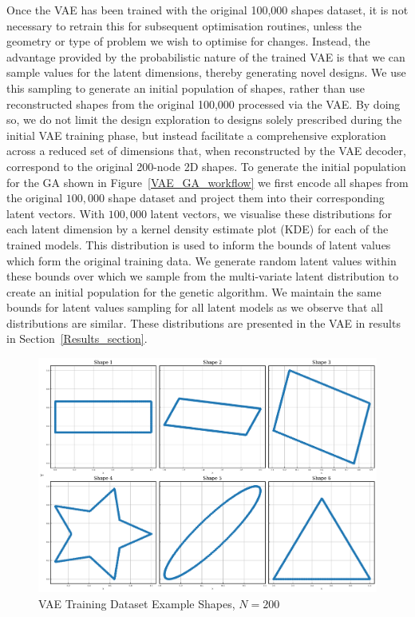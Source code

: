 \documentclass{article}
\begin{document}
Once the VAE has been trained with the original 100,000 shapes dataset, it is not necessary to retrain this for subsequent optimisation routines, unless the geometry or type of problem we wish to optimise for changes. Instead, the advantage provided by the probabilistic nature of the trained VAE is that we can sample values for the latent dimensions, thereby generating novel designs. We use this sampling to generate an initial population of shapes, rather than use reconstructed shapes from the original 100,000 processed via the VAE. By doing so, we do not limit the design exploration to designs solely prescribed during the initial VAE training phase, but instead facilitate a comprehensive exploration across a reduced set of dimensions that, when reconstructed by the VAE decoder, correspond to the original 200-node 2D shapes. To generate the initial population for the GA shown in Figure~\ref{VAE_GA_workflow} we first encode all shapes from the original $100,000$ shape dataset and project them into their corresponding latent vectors. With $100,000$ latent vectors, we visualise these distributions for each latent dimension by a kernel density estimate plot (KDE) for each of the trained models. This distribution is used to inform the bounds of latent values which form the original training data. We generate random latent values within these bounds over which we sample from the multi-variate latent distribution to create an initial population for the genetic algorithm. We maintain the same bounds for latent values sampling for all latent models as we observe that all distributions are similar. These distributions are presented in the VAE in results in Section~\ref{Results_section}.

\begin{figure}[htp]
    \centering
    \includegraphics[width=12cm]{figures/6examples_shapes.png}
    \caption{VAE Training Dataset Example Shapes, $N=200$}
    \label{fig:vae_Shapes}
\end{figure}
\newpage{}
\end{document}
